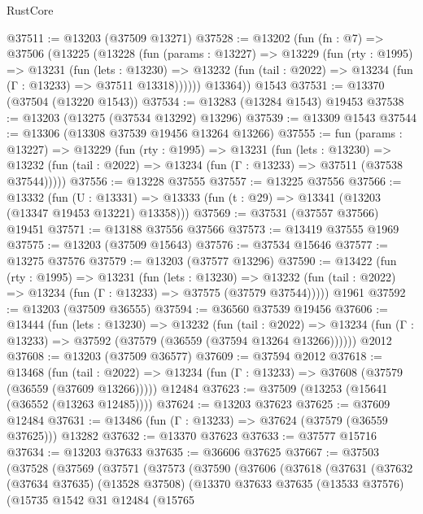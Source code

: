 \begin{lexlean}{RustCore}
\begin{coremodule}
@37511 := @13203 (@37509 @13271)
@37528 := @13202
    (fun (fn : @7) =>
    @37506
      (@13225
        (@13228
          (fun (params : @13227) =>
          @13229
            (fun (rty : @1995) =>
            @13231
              (fun (lets : @13230) =>
              @13232 (fun (tail : @2022) => @13234 (fun (Γ : @13233) => @37511 @13318))))))
        @13364))
    @1543
@37531 := @13370 (@37504 (@13220 @1543))
@37534 := @13283 (@13284 @1543) @19453
@37538 := @13203 (@13275 (@37534 @13292) @13296)
@37539 := @13309 @1543
@37544 := @13306 (@13308 @37539 @19456 @13264 @13266)
@37555 := fun (params : @13227) =>
  @13229
    (fun (rty : @1995) =>
    @13231
      (fun (lets : @13230) =>
      @13232 (fun (tail : @2022) => @13234 (fun (Γ : @13233) => @37511 (@37538 @37544)))))
@37556 := @13228 @37555
@37557 := @13225 @37556
@37566 := @13332
    (fun (U : @13331) => @13333 (fun (t : @29) => @13341 (@13203 (@13347 @19453 @13221) @13358)))
@37569 := @37531 (@37557 @37566) @19451
@37571 := @13188 @37556 @37566
@37573 := @13419 @37555 @1969
@37575 := @13203 (@37509 @15643)
@37576 := @37534 @15646
@37577 := @13275 @37576
@37579 := @13203 (@37577 @13296)
@37590 := @13422
    (fun (rty : @1995) =>
    @13231
      (fun (lets : @13230) =>
      @13232 (fun (tail : @2022) => @13234 (fun (Γ : @13233) => @37575 (@37579 @37544)))))
    @1961
@37592 := @13203 (@37509 @36555)
@37594 := @36560 @37539 @19456
@37606 := @13444
    (fun (lets : @13230) =>
    @13232
      (fun (tail : @2022) =>
      @13234 (fun (Γ : @13233) => @37592 (@37579 (@36559 (@37594 @13264 @13266))))))
    @2012
@37608 := @13203 (@37509 @36577)
@37609 := @37594 @2012
@37618 := @13468
    (fun (tail : @2022) => @13234 (fun (Γ : @13233) => @37608 (@37579 (@36559 (@37609 @13266)))))
    @12484
@37623 := @37509 (@13253 (@15641 (@36552 (@13263 @12485))))
@37624 := @13203 @37623
@37625 := @37609 @12484
@37631 := @13486 (fun (Γ : @13233) => @37624 (@37579 (@36559 @37625))) @13282
@37632 := @13370 @37623
@37633 := @37577 @15716
@37634 := @13203 @37633
@37635 := @36606 @37625
@37667 := @37503
    (@37528
      (@37569
        (@37571
          (@37573
            (@37590
              (@37606
                (@37618
                  (@37631
                    (@37632
                      (@37634 @37635)
                      (@13528 @37508)
                      (@13370
                        @37633
                        @37635
                        (@13533 @37576)
                        (@15735
                          @1542
                          @31
                          @12484
                          (@15765

\end{coremodule}
\end{lexlean}
